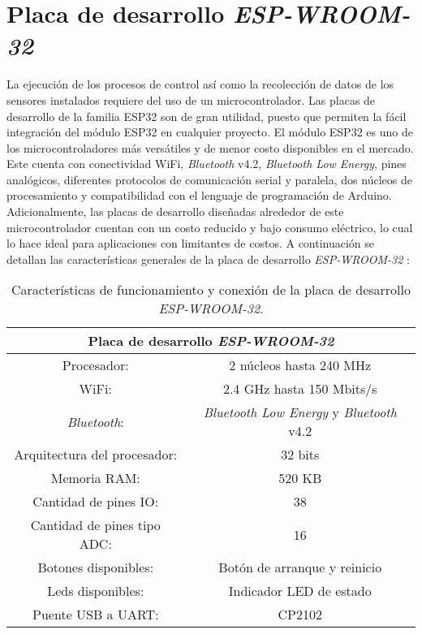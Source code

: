 \section{Placa de desarrollo \textit{ESP-WROOM-32}}
La ejecución de los procesos de control así como la recolección de datos de los sensores instalados requiere del uso de un microcontrolador. Las placas de desarrollo de la familia ESP32 son de gran utilidad, puesto que permiten la fácil integración del módulo ESP32 en cualquier proyecto. El módulo ESP32 es uno de los microcontroladores más versátiles y de menor costo disponibles en el mercado. Este cuenta con conectividad WiFi, \textit{Bluetooth} v4.2, \textit{Bluetooth Low Energy}, pines analógicos, diferentes protocolos de comunicación serial y paralela, dos núcleos de procesamiento y compatibilidad con el lenguaje de programación de Arduino. Adicionalmente, las placas de desarrollo diseñadas alrededor de este microcontrolador cuentan con un costo reducido y bajo consumo eléctrico, lo cual lo hace ideal para aplicaciones con limitantes de costos. A continuación se detallan las características generales de la placa de desarrollo \textit{ESP-WROOM-32} \cite{electronic_wings_espwroom32}:

\begin{table}[H]
	\centering
	\begin{tabular}{|c|c|}
		\hline
		\multicolumn{2}{|c|}{\textbf{Placa de desarrollo \textit{ESP-WROOM-32}}}\\ \hline
		Procesador: & 2 núcleos hasta 240 MHz \\ \hline
		WiFi: & 2.4 GHz hasta 150 Mbits/s \\ \hline
		\textit{Bluetooth}: & \textit{Bluetooth Low Energy} y \textit{Bluetooth} v4.2 \\ \hline
		Arquitectura del procesador: & 32 bits \\ \hline
		Memoria RAM: & 520 KB \\ \hline
		Cantidad de pines IO: & 38 \\ \hline
		Cantidad de pines tipo ADC: & 16 \\ \hline
		Botones disponibles: & Botón de arranque y reinicio \\ \hline
		Leds disponibles: & Indicador LED de estado \\ \hline
		Puente USB a UART: & CP2102 \\ \hline
	\end{tabular}
	\caption{Características de funcionamiento y conexión de la placa de desarrollo \textit{ESP-WROOM-32}.}
	\label{Cuadro6}
\end{table}

